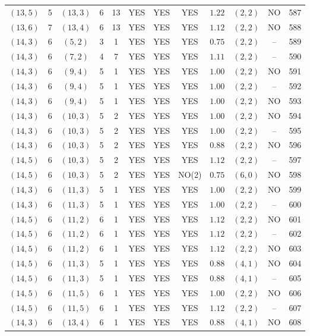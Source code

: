 \begin{longtable}{|c|c|c|c|c|c|c|c|c|c|c|c|}
$(13,5)$ & 5 & $(13,3)$ & 6 & 13 & YES & YES & YES & $1.22$ & $(2,2)$ & NO & 587\\
$(13,6)$ & 7 & $(13,4)$ & 6 & 13 & YES & YES & YES & $1.12$ & $(2,2)$ & NO & 588\\
$(14,3)$ & 6 & $(5,2)$ & 3 & 1 & YES & YES & YES & $0.75$ & $(2,2)$ & -- & 589\\
$(14,3)$ & 6 & $(7,2)$ & 4 & 7 & YES & YES & YES & $1.11$ & $(2,2)$ & -- & 590\\
$(14,3)$ & 6 & $(9,4)$ & 5 & 1 & YES & YES & YES & $1.00$ & $(2,2)$ & NO & 591\\
$(14,3)$ & 6 & $(9,4)$ & 5 & 1 & YES & YES & YES & $1.00$ & $(2,2)$ & -- & 592\\
$(14,3)$ & 6 & $(9,4)$ & 5 & 1 & YES & YES & YES & $1.00$ & $(2,2)$ & NO & 593\\
$(14,3)$ & 6 & $(10,3)$ & 5 & 2 & YES & YES & YES & $1.00$ & $(2,2)$ & NO & 594\\
$(14,3)$ & 6 & $(10,3)$ & 5 & 2 & YES & YES & YES & $1.00$ & $(2,2)$ & -- & 595\\
$(14,3)$ & 6 & $(10,3)$ & 5 & 2 & YES & YES & YES & $0.88$ & $(2,2)$ & NO & 596\\
$(14,5)$ & 6 & $(10,3)$ & 5 & 2 & YES & YES & YES & $1.12$ & $(2,2)$ & -- & 597\\
$(14,5)$ & 6 & $(10,3)$ & 5 & 2 & YES & YES & NO(2) & $0.75$ & $(6,0)$ & NO & 598\\
$(14,3)$ & 6 & $(11,3)$ & 5 & 1 & YES & YES & YES & $1.00$ & $(2,2)$ & NO & 599\\
$(14,3)$ & 6 & $(11,3)$ & 5 & 1 & YES & YES & YES & $1.00$ & $(2,2)$ & -- & 600\\
$(14,5)$ & 6 & $(11,2)$ & 6 & 1 & YES & YES & YES & $1.12$ & $(2,2)$ & NO & 601\\
$(14,5)$ & 6 & $(11,2)$ & 6 & 1 & YES & YES & YES & $1.12$ & $(2,2)$ & -- & 602\\
$(14,5)$ & 6 & $(11,2)$ & 6 & 1 & YES & YES & YES & $1.12$ & $(2,2)$ & NO & 603\\
$(14,5)$ & 6 & $(11,3)$ & 5 & 1 & YES & YES & YES & $0.88$ & $(4,1)$ & NO & 604\\
$(14,5)$ & 6 & $(11,3)$ & 5 & 1 & YES & YES & YES & $0.88$ & $(4,1)$ & -- & 605\\
$(14,5)$ & 6 & $(11,5)$ & 6 & 1 & YES & YES & YES & $1.00$ & $(2,2)$ & NO & 606\\
$(14,5)$ & 6 & $(11,5)$ & 6 & 1 & YES & YES & YES & $1.12$ & $(2,2)$ & -- & 607\\
$(14,3)$ & 6 & $(13,4)$ & 6 & 1 & YES & YES & YES & $0.88$ & $(4,1)$ & NO & 608\\

\end{longtable}
